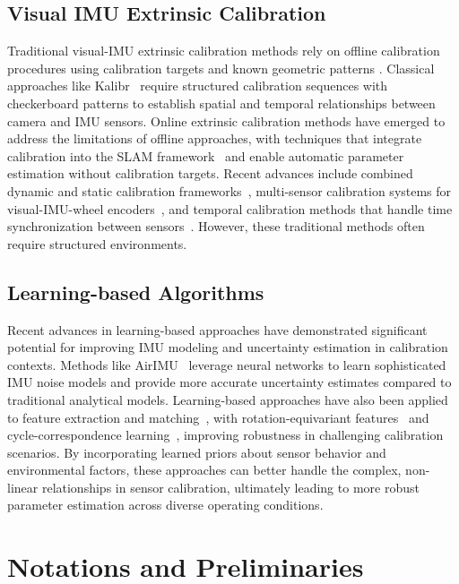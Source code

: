 \subsection{Visual IMU Extrinsic Calibration}
Traditional visual-IMU extrinsic calibration methods rely on offline calibration procedures using calibration targets and known geometric patterns \cite{kalibr}.
Classical approaches like Kalibr~\cite{furgale2013unified} require structured calibration sequences with checkerboard patterns to establish spatial and temporal relationships between camera and IMU sensors.
Online extrinsic calibration methods have emerged to address the limitations of offline approaches, with techniques that integrate calibration into the SLAM framework~\cite{huang2018online} and enable automatic parameter estimation without calibration targets.
Recent advances include combined dynamic and static calibration frameworks~\cite{wang2025dynamic}, multi-sensor calibration systems for visual-IMU-wheel encoders~\cite{qiao2023viw}, and temporal calibration methods that handle time synchronization between sensors~\cite{petit2020time}.
However, these traditional methods often require structured environments.

\subsection{Learning-based Algorithms}
Recent advances in learning-based approaches have demonstrated significant potential for improving IMU modeling and uncertainty estimation in calibration contexts.
Methods like AirIMU~\cite{qiu2023airimu} leverage neural networks to learn sophisticated IMU noise models and provide more accurate uncertainty estimates compared to traditional analytical models.
Learning-based approaches have also been applied to feature extraction and matching~\cite{lee2024lpl}, with rotation-equivariant features~\cite{lee2023rotation} and cycle-correspondence learning~\cite{adrian2024cycle}, improving robustness in challenging calibration scenarios.
By incorporating learned priors about sensor behavior and environmental factors, these approaches can better handle the complex, non-linear relationships in sensor calibration, ultimately leading to more robust parameter estimation across diverse operating conditions.


\section{Notations and Preliminaries}
\label{sec:maci2:preliminaries}

